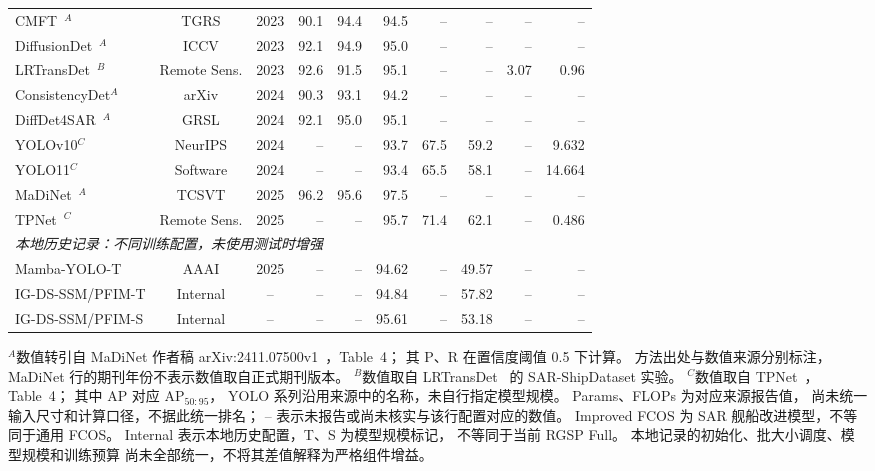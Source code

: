 \begin{table}[!t]
\begin{tabular*}{\textwidth}{@{\extracolsep{\fill}}lccrrrrrrr}
CMFT~\cite{cmft2023}$^{A}$
& TGRS & 2023
& 90.1 & 94.4 & 94.5 & -- & -- & -- & -- \\
DiffusionDet~\cite{diffusiondet2023}$^{A}$
& ICCV & 2023
& 92.1 & 94.9 & 95.0 & -- & -- & -- & -- \\
LRTransDet~\cite{lrtransdet2023}$^{B}$
& Remote Sens. & 2023
& 92.6 & 91.5 & 95.1 & -- & -- & 3.07 & 0.96 \\
ConsistencyDet$^{A}$
& arXiv & 2024
& 90.3 & 93.1 & 94.2 & -- & -- & -- & -- \\
DiffDet4SAR~\cite{diffdet4sar2024}$^{A}$
& GRSL & 2024
& 92.1 & 95.0 & 95.1 & -- & -- & -- & -- \\
YOLOv10$^{C}$
& NeurIPS & 2024
& -- & -- & 93.7 & 67.5 & 59.2 & -- & 9.632 \\
YOLO11$^{C}$
& Software & 2024
& -- & -- & 93.4 & 65.5 & 58.1 & -- & 14.664 \\
MaDiNet~\cite{madinet2025}$^{A}$
& TCSVT & 2025
& 96.2 & 95.6 & 97.5 & -- & -- & -- & -- \\
TPNet~\cite{tpnet2025}$^{C}$
& Remote Sens. & 2025
& -- & -- & 95.7 & 71.4 & 62.1 & -- & 0.486 \\
\midrule
\multicolumn{10}{l}{
\textit{本地历史记录：不同训练配置，未使用测试时增强}} \\
Mamba-YOLO-T~\cite{mambayolo2024}
& AAAI & 2025
& -- & -- & 94.62 & -- & 49.57 & -- & -- \\
IG-DS-SSM/PFIM-T
& Internal & --
& -- & -- & 94.84 & -- & 57.82 & -- & -- \\
IG-DS-SSM/PFIM-S
& Internal & --
& -- & -- & 95.61 & -- & 53.18 & -- & -- \\
\bottomrule
\end{tabular*}
\smallskip
\begin{minipage}{\linewidth}
\footnotesize
$^{A}$数值转引自 MaDiNet 作者稿
arXiv:2411.07500v1~\cite{madinet_preprint}，Table~4；
其 P、R 在置信度阈值 0.5 下计算。
方法出处与数值来源分别标注，
MaDiNet 行的期刊年份不表示数值取自正式期刊版本。
$^{B}$数值取自 LRTransDet~\cite{lrtransdet2023}
的 SAR-ShipDataset 实验。
$^{C}$数值取自 TPNet~\cite{tpnet2025}，Table~4；
其中 AP 对应 AP$_{50:95}$，
YOLO 系列沿用来源中的名称，未自行指定模型规模。
Params、FLOPs 为对应来源报告值，
尚未统一输入尺寸和计算口径，不据此统一排名；
-- 表示未报告或尚未核实与该行配置对应的数值。
Improved FCOS 为 SAR 舰船改进模型，不等同于通用 FCOS。
Internal 表示本地历史配置，T、S 为模型规模标记，
不等同于当前 RGSP Full。
本地记录的初始化、批大小调度、模型规模和训练预算
尚未全部统一，不将其差值解释为严格组件增益。
\end{minipage}
\end{table}

